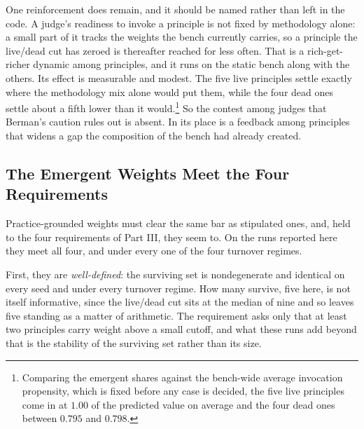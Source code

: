One reinforcement does remain, and it should be named rather than left in the
code. A judge's readiness to invoke a principle is not fixed by methodology
alone: a small part of it tracks the weights the bench currently carries, so a
principle the live/dead cut has zeroed is thereafter reached for less often.
That is a rich-get-richer dynamic among principles, and it runs on the static
bench along with the others. Its effect is measurable and modest. The five
live principles settle exactly where the methodology mix alone would put them,
while the four dead ones settle about a fifth lower than it
would.\footnote{Comparing the emergent shares against the bench-wide average
invocation propensity, which is fixed before any case is decided, the five
live principles come in at $1.00$ of the predicted value on average and the
four dead ones between $0.795$ and $0.798$.} So
the contest among judges that Berman's caution rules out is absent. In its
place is a feedback among principles that widens a gap the composition of the
bench had already created.

\subsection{The Emergent Weights Meet the Four Requirements}

Practice-grounded weights must clear the same bar as stipulated ones, and,
held to the four requirements of Part III, they seem to.
On the runs reported here they meet all four, and under every one of the four
turnover regimes.

First, they are \textit{well-defined}: the surviving set is nondegenerate and
identical on every seed and under every turnover regime. How many survive,
five here, is not itself informative, since the live/dead cut sits at the
median of nine and so leaves five standing as a matter of arithmetic. The
requirement asks only that at least two principles carry weight above a small
cutoff, and what these runs add beyond that is the stability of the surviving
set rather than its size.

